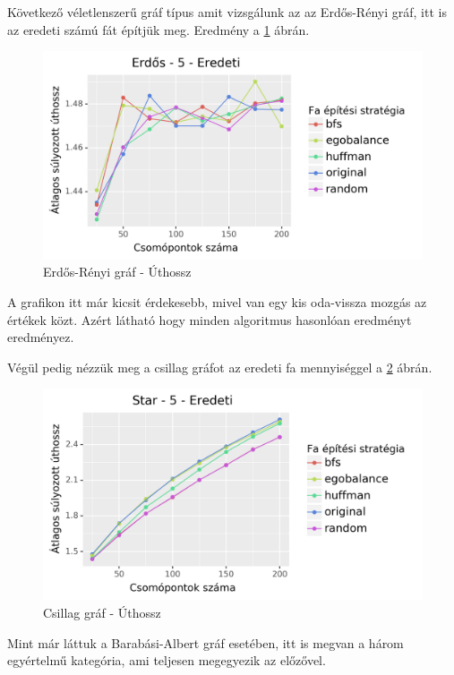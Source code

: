 \documentclass[12pt]{report}
\begin{document}
Következő véletlenszerű gráf típus amit vizsgálunk az az Erdős-Rényi gráf, itt is az eredeti számú fát építjük meg.
Eredmény a \ref{erdos-len} ábrán.

\begin{figure}[H]
	\begin{center}
		\includegraphics[width=0.9\linewidth]{pictures/erdos_len_e.png}
		\caption{Erdős-Rényi gráf - Úthossz}
		\label{erdos-len}
	\end{center}
\end{figure}

A grafikon itt már kicsit érdekesebb, mivel van egy kis oda-vissza mozgás az értékek közt. Azért látható hogy minden algoritmus hasonlóan eredményt eredményez.


Végül pedig nézzük meg a csillag gráfot az eredeti fa mennyiséggel a \ref{star-len} ábrán.

\begin{figure}[H]
	\begin{center}
		\includegraphics[width=0.9\linewidth]{pictures/star_len_e.png}
		\caption{Csillag gráf - Úthossz}
		\label{star-len}
	\end{center}
\end{figure}

Mint már láttuk a Barabási-Albert gráf esetében, itt is megvan a három egyértelmű kategória, ami teljesen megegyezik az előzővel.
\end{document}
